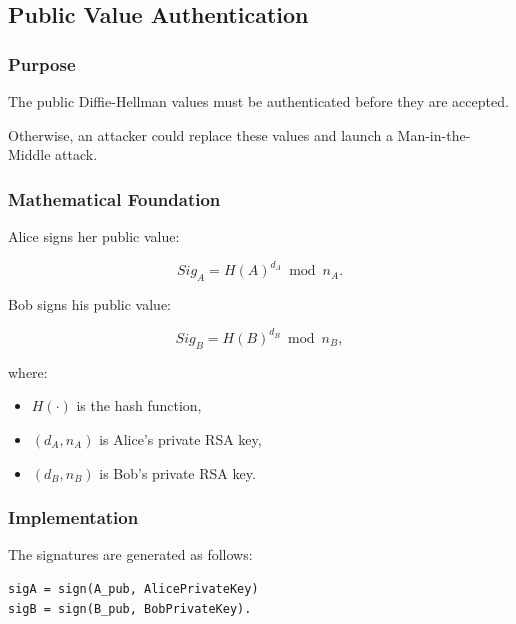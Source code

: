 \documentclass[12pt]{article}
\begin{document}

\subsection{Public Value Authentication}

\subsubsection{Purpose}

The public Diffie-Hellman values must be authenticated before they are
accepted.

Otherwise, an attacker could replace these values and launch a
Man-in-the-Middle attack.

\subsubsection{Mathematical Foundation}

Alice signs her public value:

\begin{equation}
Sig_A = H(A)^{d_A} \bmod n_A.
\end{equation}

Bob signs his public value:

\begin{equation}
Sig_B = H(B)^{d_B} \bmod n_B,
\end{equation}

where:

\begin{itemize}
\item $H(\cdot)$ is the hash function,
\item $(d_A,n_A)$ is Alice's private RSA key,
\item $(d_B,n_B)$ is Bob's private RSA key.
\end{itemize}

\subsubsection{Implementation}

The signatures are generated as follows:

\begin{verbatim}
sigA = sign(A_pub, AlicePrivateKey)
sigB = sign(B_pub, BobPrivateKey).
\end{verbatim}

\end{document}
